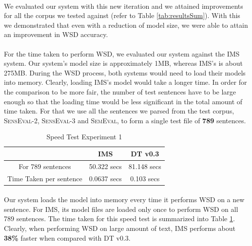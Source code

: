\paragraph{}
We evaluated our system with this new iteration and we attained improvements for all the corpus we tested against (refer to Table \ref{tab:resultsSum}). With this we demonstrated that even with a reduction of model size, we were able to attain an improvement in WSD accuracy.

\paragraph{}
For the time taken to perform WSD, we evaluated our system against the IMS system. Our system's model size is approximately 1MB, whereas IMS's is about 275MB. During the WSD process, both systems would need to load their models into memory. Clearly, loading IMS's model would take a longer time. In order for the comparison to be more fair, the number of test sentences have to be large enough so that the loading time would be less significant in the total amount of time taken. For that we use all the sentences we parsed from the test corpus, \textsc{SensEval-2}, \textsc{SensEval-3} and \textsc{SemEval}, to form a single test file of \textbf{789} sentences.

\begin{table}[h]
\center
\begin{tabular}{| c | c | c |}
\hline
& IMS & DT v0.3 \\
\hline
For 789 sentences & 50.322 secs & 81.148 secs \\
\hline
Time Taken per sentence & 0.0637 secs & 0.103 secs \\
\hline
\end{tabular}
\caption{Speed Test Experiment 1}
\label{tab:speedTest}
\end{table}

\paragraph{}
Our system loads the model into memory every time it performs WSD on a new sentence. For IMS, its model files are loaded only once to perform WSD on all 789 sentences. The time taken for this speed test is summarized into Table \ref{tab:speedTest}. Clearly, when performing WSD on large amount of text, IMS performs about \textbf{38\%} faster when compared with DT v0.3.

